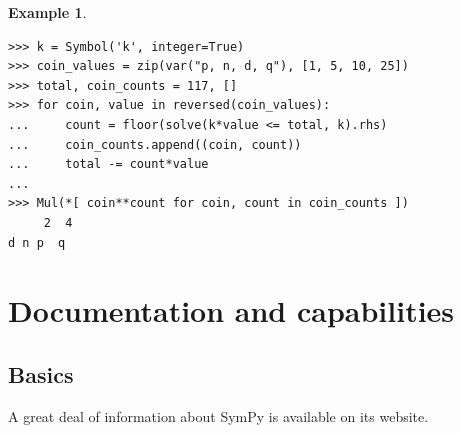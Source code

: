 \documentclass[12pt]{article}
\newtheorem{example}[theorem]{Example}
\begin{document}
\begin{example}
{\begin{Verbatim}[fontsize=\scriptsize,fontfamily=courier,fontshape=tt,frame=single,label=SymPy]
>>> k = Symbol('k', integer=True)
>>> coin_values = zip(var("p, n, d, q"), [1, 5, 10, 25])
>>> total, coin_counts = 117, []
>>> for coin, value in reversed(coin_values):
...     count = floor(solve(k*value <= total, k).rhs)
...     coin_counts.append((coin, count))
...     total -= count*value
...
>>> Mul(*[ coin**count for coin, count in coin_counts ])
     2  4
d n p  q
\end{Verbatim}

}
\end{example}




\section{Documentation and capabilities}



\subsection{Basics}

A great deal of information about SymPy is available on its website.
\end{document}
